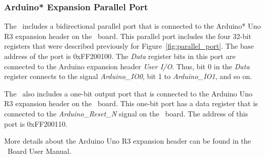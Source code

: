 \subsubsection{Arduino* Expansion Parallel Port}

The \systemName~includes a bidirectional parallel port that is connected to the
Arduino* Uno R3 expansion header on the \DEBoard~board.  This parallel port includes the 
four 32-bit registers that were described previously for Figure~\ref{fig:parallel_port}. The 
base address of the port is {\sf 0xFF200100}. The {\it Data} register bits in this port are 
connected to the Arduino expansion header {\it User I/O}. Thus, bit 0 in the {\it Data} register
connects to the signal {\it Arduino\_IO0}, bit 1 to {\it Arduino\_IO1}, and so on.  

The \systemName~also includes a one-bit output port that is connected to the
Arduino Uno R3 expansion header on the \DEBoard~board.  This one-bit port has a data 
register that is connected to the {\it Arduino\_Reset\_N} signal on the \DEBoard~board.
The address of this port is {\sf 0xFF200110}.

More details about the Arduino Uno R3 expansion header can be found in the \DEBoard~Board User Manual.